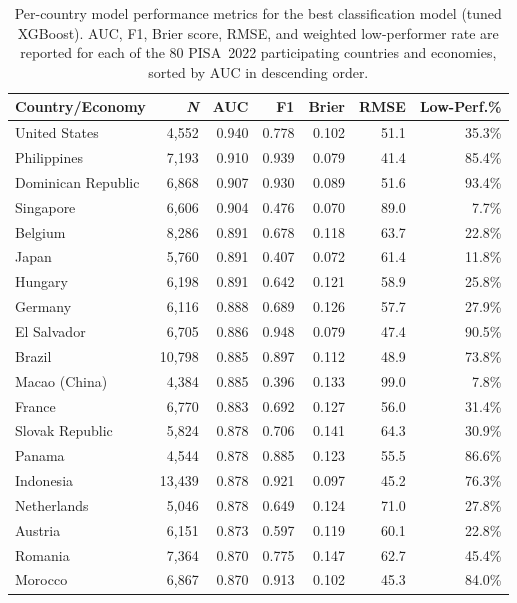 \begin{table}[htp]
\centering
\footnotesize
\renewcommand{\arraystretch}{0.68}
\caption{Per-country model performance metrics for the best classification model (tuned XGBoost). AUC, F1, Brier score, RMSE, and weighted low-performer rate are reported for each of the 80 PISA~2022 participating countries and economies, sorted by AUC in descending order.\label{tab:per-country}}
\begin{tabular}{@{}lrrrrrr@{}}
\toprule
\textbf{Country/Economy} & \textbf{\textit{N}} & \textbf{AUC} & \textbf{F1} & \textbf{Brier} & \textbf{RMSE} & \textbf{Low-Perf.\%} \\
\midrule
United States & 4,552 & 0.940 & 0.778 & 0.102 & 51.1 & 35.3\% \\
Philippines & 7,193 & 0.910 & 0.939 & 0.079 & 41.4 & 85.4\% \\
Dominican Republic & 6,868 & 0.907 & 0.930 & 0.089 & 51.6 & 93.4\% \\
Singapore & 6,606 & 0.904 & 0.476 & 0.070 & 89.0 & 7.7\% \\
Belgium & 8,286 & 0.891 & 0.678 & 0.118 & 63.7 & 22.8\% \\
Japan & 5,760 & 0.891 & 0.407 & 0.072 & 61.4 & 11.8\% \\
Hungary & 6,198 & 0.891 & 0.642 & 0.121 & 58.9 & 25.8\% \\
Germany & 6,116 & 0.888 & 0.689 & 0.126 & 57.7 & 27.9\% \\
El Salvador & 6,705 & 0.886 & 0.948 & 0.079 & 47.4 & 90.5\% \\
Brazil & 10,798 & 0.885 & 0.897 & 0.112 & 48.9 & 73.8\% \\
Macao (China) & 4,384 & 0.885 & 0.396 & 0.133 & 99.0 & 7.8\% \\
France & 6,770 & 0.883 & 0.692 & 0.127 & 56.0 & 31.4\% \\
Slovak Republic & 5,824 & 0.878 & 0.706 & 0.141 & 64.3 & 30.9\% \\
Panama & 4,544 & 0.878 & 0.885 & 0.123 & 55.5 & 86.6\% \\
Indonesia & 13,439 & 0.878 & 0.921 & 0.097 & 45.2 & 76.3\% \\
Netherlands & 5,046 & 0.878 & 0.649 & 0.124 & 71.0 & 27.8\% \\
Austria & 6,151 & 0.873 & 0.597 & 0.119 & 60.1 & 22.8\% \\
Romania & 7,364 & 0.870 & 0.775 & 0.147 & 62.7 & 45.4\% \\
Morocco & 6,867 & 0.870 & 0.913 & 0.102 & 45.3 & 84.0\% \\

\end{tabular}
\end{table}
